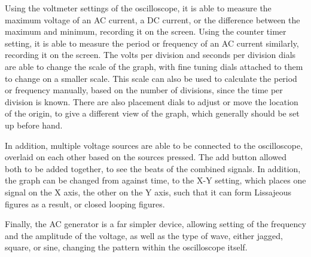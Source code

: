 \documentclass[11pt, titlepage]{article}
\begin{document}
Using the voltmeter settings of the oscilloscope, it is able to measure the maximum voltage of an AC current, a DC current, or the difference between the maximum and minimum, recording it on the screen. Using the counter timer setting, it is able to measure the period or frequency of an AC current similarly, recording it on the screen. The volts per division and seconds per division dials are able to change the scale of the graph, with fine tuning dials attached to them to change on a smaller scale. This scale can also be used to calculate the period or frequency manually, based on the number of divisions, since the time per division is known.  There are also placement dials to adjust or move the location of the origin, to give a different view of the graph, which generally should be set up before hand.

In addition, multiple voltage sources are able to be connected to the oscilloscope, overlaid on each other based on the sources pressed. The add button allowed both to be added together, to see the beats of the combined signals. In addition, the graph can be changed from against time, to the X-Y setting, which places one signal on the X axis, the other on the Y axis, such that it can form Lissajeous figures as a result, or closed looping figures.

Finally, the AC generator is a far simpler device, allowing setting of the frequency and the amplitude of the voltage, as well as the type of wave, either jagged, square, or sine, changing the pattern within the oscilloscope itself.
\end{document}
